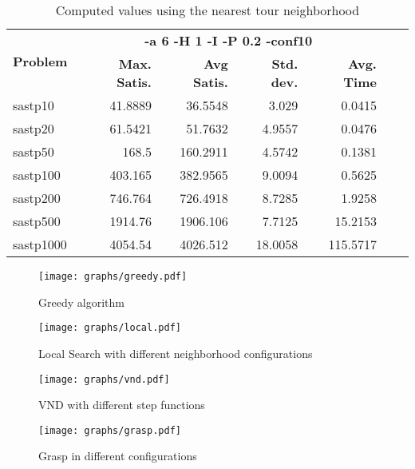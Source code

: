 \documentclass{article}
\begin{document}
\begin{table}[b!]
  \vspace{-6mm}%
  \caption{Computed values using the nearest tour neighborhood}
  \label{tab:NearestTour}
  \setlength{\tabcolsep}{1.4mm}
  \centering
  \begin{tabular}{lrrrrrr}
   \multirow{2}{*}{\bfseries Problem} &
      \multicolumn{4}{c}{\bfseries -a 6 -H 1 -I -P 0.2 -conf10 } \\
    &
    \bfseries Max. Satis. &
    \bfseries Avg Satis. &
    \bfseries Std. dev. &
    \bfseries Avg. Time 
    \\\hline
sastp10 & 41.8889 & 36.5548 & 3.029 & 0.0415 \\ 
sastp20 & 61.5421 & 51.7632 & 4.9557 & 0.0476 \\ 
sastp50 & 168.5 & 160.2911 & 4.5742 & 0.1381 \\ 
sastp100 & 403.165 & 382.9565 & 9.0094 & 0.5625 \\ 
sastp200 & 746.764 & 726.4918 & 8.7285 & 1.9258 \\ 
sastp500 & 1914.76 & 1906.106 & 7.7125 & 15.2153 \\ 
sastp1000 & 4054.54 & 4026.512 & 18.0058 & 115.5717
    \\\hline
  \end{tabular}

\end{table}






\begin{figure}[htb]
\centering
\texttt{[image: graphs/greedy.pdf]}
\caption{Greedy algorithm}
\label{fig:greedy}
\end{figure}

\begin{figure}[htb]
\centering
\texttt{[image: graphs/local.pdf]}
\caption{Local Search with different neighborhood configurations}
\label{fig:localSearch}
\end{figure}

\begin{figure}[htb]
\centering
\texttt{[image: graphs/vnd.pdf]}
\caption{VND with different step functions}
\label{fig:vnd}
\end{figure}

\begin{figure}[htb]
\centering
\texttt{[image: graphs/grasp.pdf]}
\caption{Grasp in different configurations}
\label{fig:grasp}
\end{figure}
\end{document}
